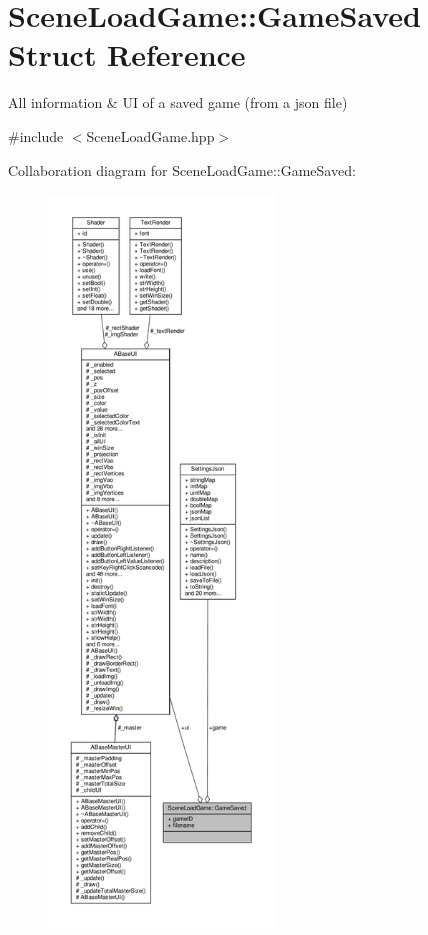 \hypertarget{struct_scene_load_game_1_1_game_saved}{}\section{Scene\+Load\+Game\+:\+:Game\+Saved Struct Reference}
\label{struct_scene_load_game_1_1_game_saved}


All information \& UI of a saved game (from a json file)  




{\ttfamily \#include $<$Scene\+Load\+Game.\+hpp$>$}



Collaboration diagram for Scene\+Load\+Game\+:\+:Game\+Saved\+:
\nopagebreak
\begin{figure}[H]
\begin{center}
\leavevmode
\includegraphics[height=550pt]{struct_scene_load_game_1_1_game_saved__coll__graph}
\end{center}
\end{figure}
